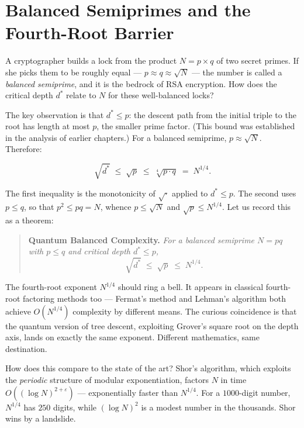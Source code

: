 \section{Balanced Semiprimes and the Fourth-Root Barrier}\label{ch7-balanced-semiprimes-and-the-fourth-root-barrier}

A cryptographer builds a lock from the product \(N = p \times q\) of two secret primes. If she picks them to be roughly equal --- \(p \approx q \approx \sqrt{N}\) --- the number is called a \emph{balanced semiprime}, and it is the bedrock of RSA encryption. How does the critical depth \(d^*\) relate to \(N\) for these well-balanced locks?

The key observation is that \(d^* \leq p\): the descent path from the initial triple to the root has length at most \(p\), the smaller prime factor. (This bound was established in the analysis of earlier chapters.) For a balanced semiprime, \(p \approx \sqrt{N}\). Therefore:

\[\sqrt{d^*} \;\leq\; \sqrt{p} \;\leq\; \sqrt[4]{p \cdot q} \;=\; N^{1/4}.\]

The first inequality is the monotonicity of \(\sqrt{\cdot}\) applied to \(d^* \leq p\). The second uses \(p \leq q\), so that \(p^2 \leq pq = N\), whence \(p \leq \sqrt{N}\) and \(\sqrt{p} \leq N^{1/4}\). Let us record this as a theorem:

\begin{quote}
\textbf{Quantum Balanced Complexity.} \emph{For a balanced semiprime \(N = pq\) with \(p \leq q\) and critical depth \(d^* \leq p\),} \[\sqrt{d^*} \;\leq\; \sqrt{p} \;\leq\; N^{1/4}.\]
\end{quote}

The fourth-root exponent \(N^{1/4}\) should ring a bell. It appears in classical fourth-root factoring methods too --- Fermat's method and Lehman's algorithm both achieve \(O(N^{1/4})\) complexity by different means. The curious coincidence is that the quantum version of tree descent, exploiting Grover's square root on the depth axis, lands on exactly the same exponent. Different mathematics, same destination.

How does this compare to the state of the art? Shor's algorithm, which exploits the \emph{periodic} structure of modular exponentiation, factors \(N\) in time \(O((\log N)^{2+\varepsilon})\) --- exponentially faster than \(N^{1/4}\). For a \(1000\)-digit number, \(N^{1/4}\) has \(250\) digits, while \((\log N)^2\) is a modest number in the thousands. Shor wins by a landslide.

